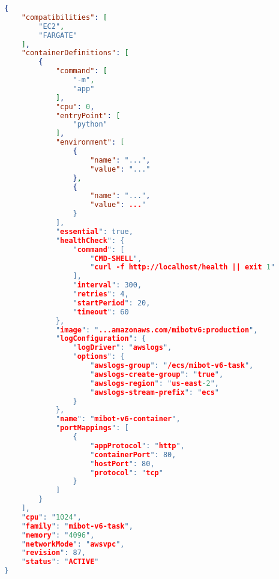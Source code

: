 \begin{lstlisting}[language=json, caption={ECS Task Definition}, label={lst:json}]
{
    "compatibilities": [
        "EC2",
        "FARGATE"
    ],
    "containerDefinitions": [
        {
            "command": [
                "-m",
                "app"
            ],
            "cpu": 0,
            "entryPoint": [
                "python"
            ],
            "environment": [
                {
                    "name": "...",
                    "value": "..."
                },
                {
                    "name": "...",
                    "value": ..."
                }
            ],
            "essential": true,
            "healthCheck": {
                "command": [
                    "CMD-SHELL",
                    "curl -f http://localhost/health || exit 1"
                ],
                "interval": 300,
                "retries": 4,
                "startPeriod": 20,
                "timeout": 60
            },
            "image": "...amazonaws.com/mibotv6:production",
            "logConfiguration": {
                "logDriver": "awslogs",
                "options": {
                    "awslogs-group": "/ecs/mibot-v6-task",
                    "awslogs-create-group": "true",
                    "awslogs-region": "us-east-2",
                    "awslogs-stream-prefix": "ecs"
                }
            },
            "name": "mibot-v6-container",
            "portMappings": [
                {
                    "appProtocol": "http",
                    "containerPort": 80,
                    "hostPort": 80,
                    "protocol": "tcp"
                }
            ]
        }
    ],
    "cpu": "1024",
    "family": "mibot-v6-task",
    "memory": "4096",
    "networkMode": "awsvpc",
    "revision": 87,
    "status": "ACTIVE"
}
\end{lstlisting}



